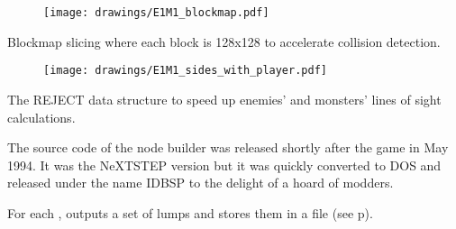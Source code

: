 \begin{figure}[H]
\centering
\texttt{[image: drawings/E1M1\_blockmap.pdf]}
\end{figure}
\par
Blockmap slicing where each block is 128x128 to accelerate collision detection.\\
\par
\begin{figure}[H]
\centering
\texttt{[image: drawings/E1M1\_sides\_with\_player.pdf]}
\end{figure}
\par
The REJECT data structure to speed up enemies' and monsters' lines of sight calculations.
\pagebreak


The source code of the node builder was released shortly after the game in May 1994. It was the NeXTSTEP version but it was quickly converted to DOS and released under the name IDBSP to the delight of a hoard of modders.\\
\par
{}
\par
For each ,  outputs a set of lumps and stores them in a  file (see p\pageref{wad_explained}).\\

